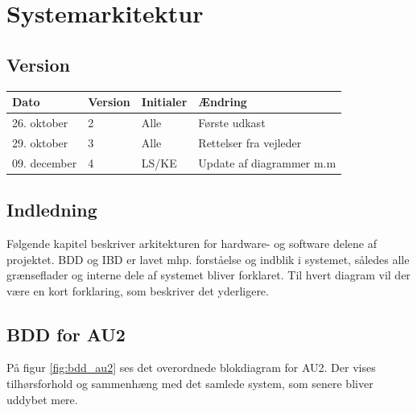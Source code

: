 \chapter{Systemarkitektur} \label{sec:sysark}

\section*{Version}
\begin{table}[h]
	\centering
	\begin{tabularx}{\textwidth - 2cm}{|l|l|l|X|}
	\hline
	Dato			& Version			& Initialer 		& Ændring										\\ \hline
	26. oktober		& 2 				& Alle				& Første udkast				\\ \hline
	29. oktober		& 3 				& Alle 				& Rettelser fra vejleder 	\\ \hline
	09. december	& 4 				& LS/KE 			& Update af diagrammer m.m	\\ \hline
	\end{tabularx}
\end{table}

\section*{Indledning}
Følgende kapitel beskriver arkitekturen for hardware- og software delene af projektet.
BDD og IBD er lavet mhp. forståelse og indblik i systemet, således alle grænseflader og interne dele af systemet bliver forklaret. Til hvert diagram vil der være en kort forklaring, som beskriver det yderligere.

\clearpage

\section{BDD for AU2}	\label{sec:BDD_for_AU2}%

På figur \ref{fig:bdd_au2} ses det overordnede blokdiagram for AU2. Der vises tilhørsforhold og sammenhæng med det samlede system, som senere bliver uddybet mere.

